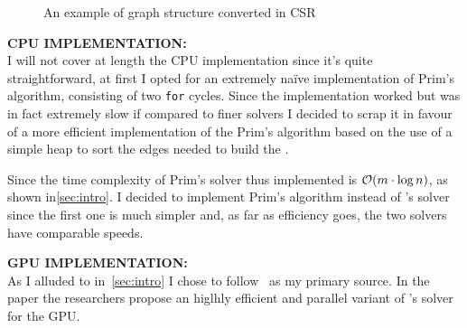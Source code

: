 \documentclass[a4paper,10pt]{article}
\begin{document}
\begin{figure}
	\centering
	
	\caption{An example of graph structure converted in CSR}
	\label{tikz:csr-struct}
\end{figure}

\bigskip
{}
\makeatletter{}\makeatother\label{sec:cpu-implementation}
\noindent
\textbf{CPU IMPLEMENTATION:}
\\
I will not cover at length the CPU implementation since it's quite straightforward, at first I opted
for an extremely na\"ive implementation of Prim's algorithm, consisting of two \texttt{for} cycles.
Since the implementation worked but was in fact extremely slow if compared to finer solvers I
decided to scrap it in favour of a more efficient implementation of the Prim's algorithm based on
the use of a simple heap to sort the edges needed to build the \mst.

Since the time complexity of Prim's solver thus implemented is $\mathcal{O}(m \cdot \log{n})$, as shown in\ref{sec:intro}. I decided to implement Prim's algorithm instead of \brka's solver since the first one is much simpler and, as far as efficiency goes, the two solvers have comparable speeds.

\bigskip
{}
\makeatletter\def\@currentlabel{\texttt{(IV)}}\makeatother\label{sec:gpu-implementation}
\noindent
\textbf{GPU IMPLEMENTATION:}
\\
As I alluded to in~\ref{sec:intro} I chose to follow~\cite{generic-he-boruvka} as my primary source. In the paper the researchers propose an higlhly efficient and parallel variant of \brka's solver for the GPU.
\end{document}

